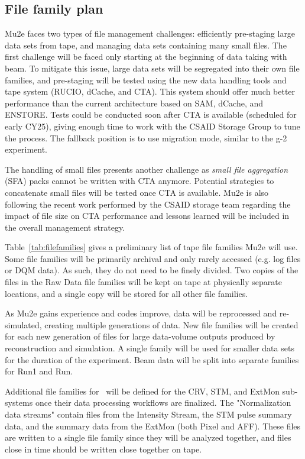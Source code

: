 \subsection{File family plan}
Mu2e faces two types of file management challenges: efficiently pre-staging large data sets from tape, and managing data sets containing many small files. The first challenge will be faced only starting at the beginning of data taking with beam. To mitigate this issue, large data sets will be segregated into their own file families, and pre-staging will be tested using the new data handling tools and tape system (RUCIO, dCache, and CTA). This system should offer much better performance than the current architecture based on SAM, dCache, and ENSTORE. Tests could be conducted soon after CTA is available (scheduled for early CY25), giving enough time to work with the CSAID Storage Group to tune the process. The fallback position is to use migration mode, similar to the g-2 experiment.

The handling of small files presents another challenge as \emph{small file aggregation} (SFA) packs cannot be written with CTA anymore. Potential strategies to concatenate small files will be tested once CTA is available. Mu2e is also following the recent work performed by the CSAID storage team regarding the impact of file size on CTA performance and lessons learned will be included in the overall management strategy.

Table~\ref{tab:filefamilies} gives a preliminary list of tape file families Mu2e will use. Some file families will be primarily archival and only rarely accessed (e.g. log files or DQM data). As such, they do not need to be finely divided. Two copies of the files in the Raw Data file families will be kept on tape at physically separate locations, and a single copy will be stored for all other file families.

As Mu2e gains experience and codes improve, data will be reprocessed and re-simulated, creating multiple generations of data. New file families will be created for each new generation of files for large data-volume outputs produced by reconstruction and simulation. A single family will be used for smaller data sets for the duration of the experiment.
Beam data will be split into separate families for Run1 and Run.

Additional file families for \passone\ will be defined for the CRV, STM, and ExtMon sub-systems once their data processing workflows are finalized. The "Normalization data streams" contain files from the Intensity Stream, the STM pulse summary data, and the summary data from the ExtMon (both Pixel and AFF). These files are written to a single file family since they will be analyzed together, and files close in time should be written close together on tape.


